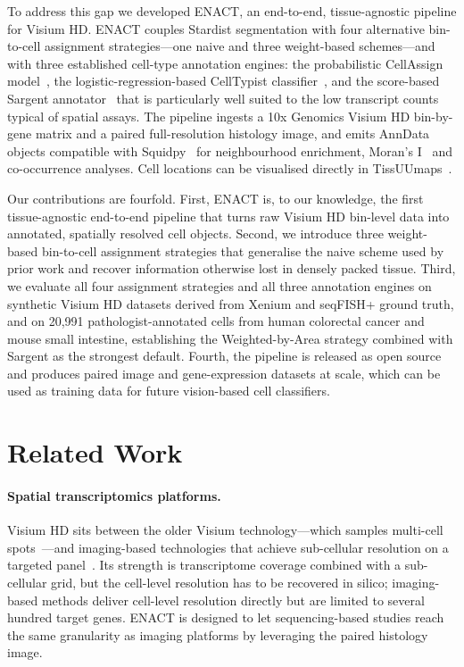 To address this gap we developed ENACT, an end-to-end, tissue-agnostic pipeline for Visium HD. ENACT couples Stardist segmentation with four alternative bin-to-cell assignment strategies---one naive and three weight-based schemes---and with three established cell-type annotation engines: the probabilistic CellAssign model~\cite{zhang2019probabilistic}, the logistic-regression-based CellTypist classifier~\cite{conde2022celltypist}, and the score-based Sargent annotator~\cite{nouri2024sargent} that is particularly well suited to the low transcript counts typical of spatial assays. The pipeline ingests a 10x Genomics Visium HD bin-by-gene matrix and a paired full-resolution histology image, and emits AnnData~\cite{virshup2024anndata} objects compatible with Squidpy~\cite{palla2022squidpy} for neighbourhood enrichment, Moran's I~\cite{moran1950notes} and co-occurrence analyses. Cell locations can be visualised directly in TissUUmaps~\cite{pielawski2023tissuumaps}.

Our contributions are fourfold. First, ENACT is, to our knowledge, the first tissue-agnostic end-to-end pipeline that turns raw Visium HD bin-level data into annotated, spatially resolved cell objects. Second, we introduce three weight-based bin-to-cell assignment strategies that generalise the naive scheme used by prior work and recover information otherwise lost in densely packed tissue. Third, we evaluate all four assignment strategies and all three annotation engines on synthetic Visium HD datasets derived from Xenium and seqFISH+ ground truth, and on 20{,}991 pathologist-annotated cells from human colorectal cancer and mouse small intestine, establishing the Weighted-by-Area strategy combined with Sargent as the strongest default. Fourth, the pipeline is released as open source and produces paired image and gene-expression datasets at scale, which can be used as training data for future vision-based cell classifiers.

\section{Related Work}

\paragraph{Spatial transcriptomics platforms.}
Visium HD sits between the older Visium technology---which samples multi-cell spots~\cite{stahl2016spatialtranscriptomics}---and imaging-based technologies that achieve sub-cellular resolution on a targeted panel~\cite{chen2015merfish,moffitt2018merfish,eng2019transcriptome,janesick2023xenium,rao2021xenium}. Its strength is transcriptome coverage combined with a sub-cellular grid, but the cell-level resolution has to be recovered in silico; imaging-based methods deliver cell-level resolution directly but are limited to several hundred target genes. ENACT is designed to let sequencing-based studies reach the same granularity as imaging platforms by leveraging the paired histology image.

